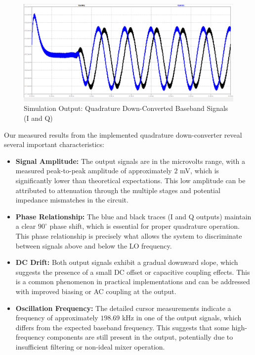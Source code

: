 \begin{figure}[H]
    \centering
    \includegraphics[width=1\linewidth]{sec/output.png}
    \caption{Simulation Output: Quadrature Down-Converted Baseband Signals (I and Q)}
    \label{fig:quad-downconv-output}
\end{figure}

Our measured results from the implemented quadrature down-converter reveal several important characteristics:

\begin{itemize}
    \item \textbf{Signal Amplitude:} The output signals are in the microvolts range, with a measured peak-to-peak amplitude of approximately $2$ mV, which is significantly lower than theoretical expectations. This low amplitude can be attributed to attenuation through the multiple stages and potential impedance mismatches in the circuit.
    
    \item \textbf{Phase Relationship:} The blue and black traces (I and Q outputs) maintain a clear $90^\circ$ phase shift, which is essential for proper quadrature operation. This phase relationship is precisely what allows the system to discriminate between signals above and below the LO frequency.
    
    \item \textbf{DC Drift:} Both output signals exhibit a gradual downward slope, which suggests the presence of a small DC offset or capacitive coupling effects. This is a common phenomenon in practical implementations and can be addressed with improved biasing or AC coupling at the output.
    
    \item \textbf{Oscillation Frequency:} The detailed cursor measurements indicate a frequency of approximately $198.69$ kHz in one of the output signals, which differs from the expected baseband frequency. This suggests that some high-frequency components are still present in the output, potentially due to insufficient filtering or non-ideal mixer operation.
\end{itemize}

